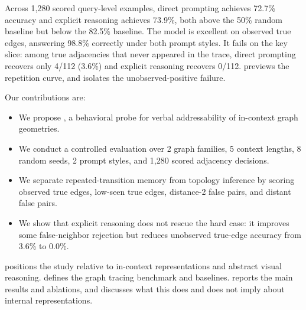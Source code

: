Across 1,280 scored query-level examples, direct prompting achieves 72.7\% accuracy and explicit reasoning achieves 73.9\%, both above the 50\% random baseline but below the 82.5\% \observedbaseline baseline. The model is excellent on observed true edges, answering 98.8\% correctly under both prompt styles. It fails on the key slice: among true adjacencies that never appeared in the trace, direct prompting recovers only 4/112 (3.6\%) and explicit reasoning recovers 0/112.  previews the repetition curve, and  isolates the unobserved-positive failure.

Our contributions are:
\begin{itemize}
    \item We propose \taskname, a behavioral probe for verbal addressability of in-context graph geometries.
    \item We conduct a controlled \gptfourone evaluation over 2 graph families, 5 context lengths, 8 random seeds, 2 prompt styles, and 1,280 scored adjacency decisions.
    \item We separate repeated-transition memory from topology inference by scoring observed true edges, low-seen true edges, distance-2 false pairs, and distant false pairs.
    \item We show that explicit reasoning does not rescue the hard case: it improves some false-neighbor rejection but reduces unobserved true-edge accuracy from 3.6\% to 0.0\%.
\end{itemize}

 positions the study relative to in-context representations and abstract visual reasoning.  defines the graph tracing benchmark and baselines.  reports the main results and ablations, and  discusses what this does and does not imply about internal representations.
